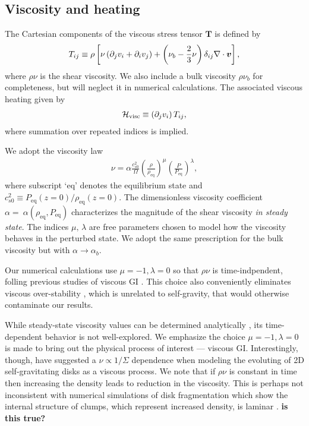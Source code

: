 \subsection{Viscosity and heating}\label{visc_model}
The Cartesian components of the viscous stress tensor $\bm{T}$ is
defined by 
\begin{align}
  T_{ij} \equiv \rho \left[\nu \left(\partial_j v_i + \partial_i v_j\right) +
    \left(\nu_b-\frac{2}{3}\nu\right)\delta_{ij}\nabla\cdot\bm{v}\right], 
\end{align}
where $\rho\nu$ is the shear viscosity. We also include a bulk
viscosity $\rho\nu_b$ for completeness, but will neglect it in
numerical calculations. The associated viscous heating given by 
\begin{align}
  \mathcal{H}_\mathrm{visc} \equiv \left(\partial_jv_i\right)T_{ij}, 
\end{align}
where summation over repeated indices is implied. 

We adopt the viscosity law  
\begin{align}\label{visc_law}
  \nu = \alpha
  \frac{c_{s0}^2}{\Omega}\left(\frac{\rho}{\rho_\mathrm{eq}}\right)^\mu\left(\frac{P}{P_\mathrm{eq}}\right)^\lambda,             
\end{align}
where subscript `eq' denotes the equilibrium state and  
$c_{s0}^2\equiv P_\mathrm{eq}(z=0)/\rho_\mathrm{eq}(z=0)$. 
The dimensionless viscosity coefficient 
$\alpha=~\alpha(\rho_\mathrm{eq},P_\mathrm{eq})$ characterizes the
magnitude of the shear viscosity \emph{in steady state}. The indices
$\mu,\,\lambda$ are free parameters chosen to model how the viscosity
behaves in the perturbed state.  
We adopt the same prescription for the bulk viscosity but
with $\alpha\to\alpha_b$.   

Our numerical calculations use $\mu=-1,\lambda=0$ so 
that $\rho\nu$ is time-indpendent, folling previous 
studies of viscous GI  
\citep{lynden-bell74,hunter83,willerding92,gammie96}.  
This choice also conveniently eliminates viscous over-stability
\citep{schmit95,latter06}, which is unrelated to self-gravity, that
would otherwise contaminate our results. %

While steady-state viscosity values can be determined 
analytically \citep[e.g.][]{rafikov15}, its time-dependent behavior is
not well-explored. We emphasize the choice $\mu=-1,\lambda=0$ is made
to bring out the physical process of interest --- viscous GI. %
Interestingly, though, \cite{laughlin96b} have suggested a $\nu \propto 1/\Sigma$
dependence when modeling the evoluting of 2D self-gravitating disks 
as a viscous process. We note that if $\rho\nu$ is constant in time
then increasing the density leads to reduction in the viscosity. 
This is perhaps not inconsistent with numerical simulations of disk
fragmentation which show the internal structure of clumps, which
represent increased density, is laminar \citep{gammie01}.  
{\bf is this true?}

